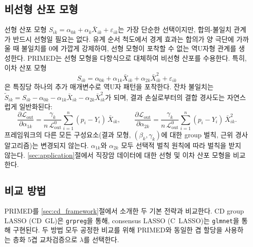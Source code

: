 \documentclass[a4paper,11pt]{article}
\begin{document}
\subsection{비선형 산포 모형}\label{sec:nonlinear}

선형 산포 모형 $S_{ik} = \alpha_{0k} + \alpha_k \bar X_{ik} + \varepsilon_{ik}$는 가장 단순한 선택이지만, 합의-불일치 관계가 반드시 선형일 필요는 없다.
유계 순서 척도에서 경계 효과는 합의가 양 극단에 가까울 때 불일치를 0에 가깝게 강제하여, 선형 모형이 포착할 수 없는 역U자형 관계를 생성한다.
PRIMED는 선형 모형을 다항식으로 대체하여 비선형 산포를 수용한다.
특히, 이차 산포 모형
\begin{equation}\label{eq:quad_disp}
  S_{ik} = \alpha_{0k} + \alpha_{1k} \bar X_{ik} + \alpha_{2k} \bar X_{ik}^2 + \varepsilon_{ik}
\end{equation}
은 특징당 하나의 추가 매개변수로 역U자 패턴을 포착한다.
잔차 불일치는 $\tilde S_{ik} = S_{ik} - \alpha_{0k} - \alpha_{1k} \bar X_{ik} - \alpha_{2k} \bar X_{ik}^2$가 되며, 결과 손실로부터의 결합 경사도는 자연스럽게 일반화된다:
\[
  \frac{\partial \mathcal{L}_{\mathrm{out}}}{\partial \alpha_{1k}}
  = \frac{\gamma_k}{n\,\mathcal{L}_{\mathrm{out}}^0} \sum_{i=1}^n (p_i - Y_i)\,\bar X_{ik}, \qquad
  \frac{\partial \mathcal{L}_{\mathrm{out}}}{\partial \alpha_{2k}}
  = \frac{\gamma_k}{n\,\mathcal{L}_{\mathrm{out}}^0} \sum_{i=1}^n (p_i - Y_i)\,\bar X_{ik}^2.
\]
프레임워크의 다른 모든 구성요소(결과 모형, $(\beta_k, \gamma_k)$에 대한 group 벌칙, 근위 경사 알고리즘)는 변경되지 않는다.
$\alpha_{1k}$와 $\alpha_{2k}$ 모두 선택적 벌칙 원칙에 따라 벌칙을 받지 않는다.
\ref{sec:application}절에서 직장암 데이터에 대한 선형 및 이차 산포 모형을 비교한다.

\subsection{비교 방법}\label{sec:comparison}

PRIMED를 \ref{sec:cd_framework}절에서 소개한 두 기본 전략과 비교한다.
CD group LASSO (CD~GL)은 \texttt{grpreg}을 통해, consensus LASSO (C~LASSO)는 \texttt{glmnet}을 통해 구현된다.
두 방법 모두 공정한 비교를 위해 PRIMED와 동일한 겹 할당을 사용하는 층화 5겹 교차검증으로 $\lambda$를 선택한다.
\end{document}
